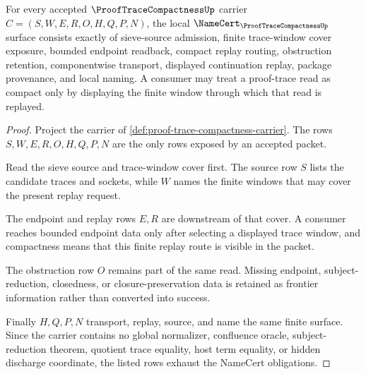 \begin{theorem}
\label{thm:proof-trace-compactness-namecert-obligations}
For every accepted $\ProofTraceCompactnessUp$ carrier $C=(S,W,E,R,O,H,Q,P,N)$, the local $\NameCert_{\ProofTraceCompactnessUp}$ surface consists exactly of sieve-source admission, finite trace-window cover exposure, bounded endpoint readback, compact replay routing, obstruction retention, componentwise transport, displayed continuation replay, package provenance, and local naming. A consumer may treat a proof-trace read as compact only by displaying the finite window through which that read is replayed.
\end{theorem}
\begin{proof}
Project the carrier of \autoref{def:proof-trace-compactness-carrier}. The rows $S,W,E,R,O,H,Q,P,N$ are the only rows exposed by an accepted packet.

Read the sieve source and trace-window cover first. The source row $S$ lists the candidate traces and sockets, while $W$ names the finite windows that may cover the present replay request.

The endpoint and replay rows $E,R$ are downstream of that cover. A consumer reaches bounded endpoint data only after selecting a displayed trace window, and compactness means that this finite replay route is visible in the packet.

The obstruction row $O$ remains part of the same read. Missing endpoint, subject-reduction, closedness, or closure-preservation data is retained as frontier information rather than converted into success.

Finally $H,Q,P,N$ transport, replay, source, and name the same finite surface. Since the carrier contains no global normalizer, confluence oracle, subject-reduction theorem, quotient trace equality, host term equality, or hidden discharge coordinate, the listed rows exhaust the NameCert obligations.
\end{proof}

